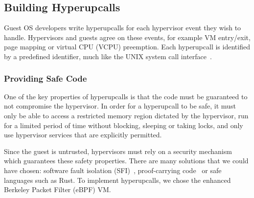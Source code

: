 \documentclass[11pt]{article}
\newcommand{\Hypercallback}{Hyperupcall\xspace{}}
\newcommand{\hypercallback}{hyperupcall\xspace{}}
\begin{document}




\subsection{Building \Hypercallback{}s}
\label{sec:building}

Guest OS developers write \hypercallback{}s for each hypervisor event
they wish to handle. Hypervisors and guests agree on these events, for example  
VM entry/exit, page mapping or virtual CPU (VCPU) preemption.
Each \hypercallback{} is identified by a predefined identifier, much
like the UNIX system call interface~\cite{ritchie1978unix}. 

\subsubsection{Providing Safe Code}

One of the key properties of \hypercallback{}s is that the code
must be guaranteed to not compromise the hypervisor. In order
for a \hypercallback{} to be safe, it must only be able to access a
restricted memory region dictated by the hypervisor, 
run for a limited period of time without blocking,
sleeping or taking locks, and only use hypervisor services that
are explicitly permitted.

Since the guest is untrusted, hypervisors must rely on
a security mechanism which guarantees these safety properties. There are many
solutions that we could have chosen: software fault isolation (SFI)~\cite{wahbe1994efficient},
proof-carrying code~\cite{necula1997proof} or safe languages such as Rust. 
To implement \hypercallback{s}, we chose the enhanced Berkeley Packet Filter (eBPF) VM.
\end{document}
